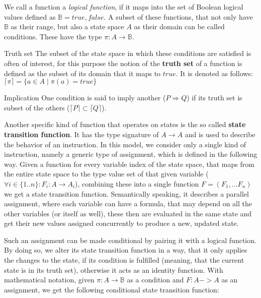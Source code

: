 We call a function a \textit{logical function}, if it maps into the set of Boolean logical values defined as $\mathbb{B} = {true , false}$. A subset of these functions, that not only have $\mathbb{B}$ as their range, but also a state space $A$ as their domain can be called conditions. These have the type $\pi : A \to \mathbb{B}$.

\begin{definition}{Truth set}
\label{def:truth-set}
The subset of the state space in which these conditions are satisfied is often of interest, for this purpose the notion of the \textbf{truth set} of a function is defined as the subset of its domain that it maps to $true$. It is denoted as follows: $\lceil \pi \rceil = \{a \in A \;|\; \pi(a) = true\}$
\end{definition}

\begin{definition}{Implication}
\label{def:implication}
One condition is said to imply another ($P \Rightarrow Q$) if its truth set is subset of the others ($\lceil P \rceil \subset \lceil Q \rceil$).
\end{definition}

Another specific kind of function that operates on states is the so called \textbf{state transition function}. It has the type signature of $A \to A$ and is used to describe the behavior of an instruction. In this model, we consider only a single kind of instruction, namely a generic type of assignment, which is defined in the following way. Given a function for every variable index of the state space, that maps from the entire state space to the type value set of that given variable ($\forall i \in \{1..n\} : F_i : A \to A_i$), combining these into a single function $F = (F_1, \ldots F_n)$ we get a state transition function. Semantically speaking, it describes a parallel assignment, where each variable can have a formula, that may depend on all the other variables (or itself as well), these then are evaluated in the same state and get their new values assigned concurrently to produce a new, updated state.

Such an assignment can be made conditional by pairing it with a logical function. By doing so, we alter its state transition function in a way, that it only applies the changes to the state, if its condition is fulfilled (meaning, that the current state is in its truth set), otherwise it acts as an identity function. With mathematical notation, given $\pi : A \to \mathbb{B}$ as a condition and $F : A -> A$ as an assignment, we get the following conditional state transition function:

